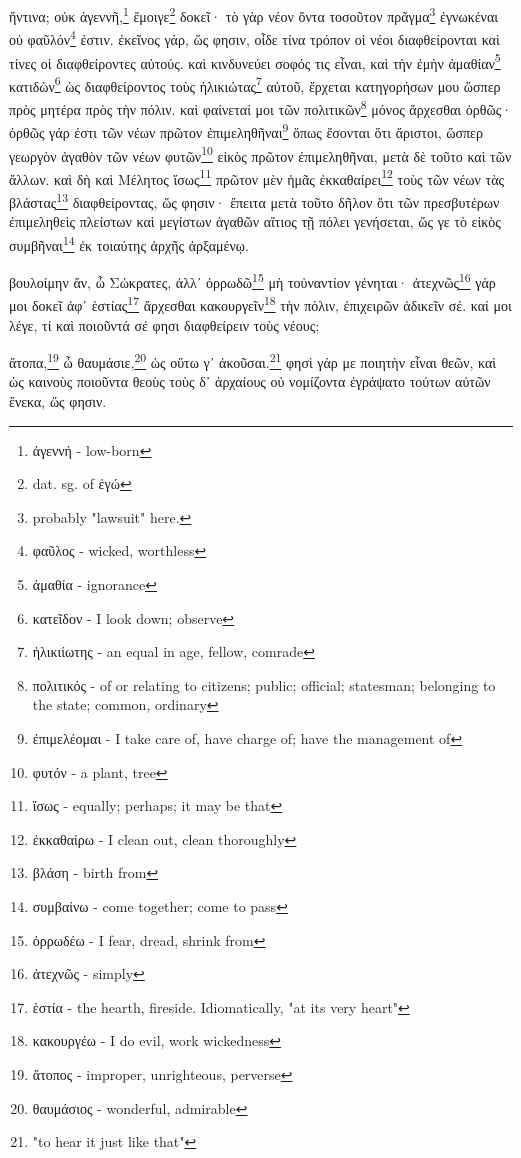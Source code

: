 ἥντινα;
οὐκ
ἀγεννῆ,\footnote{ἀγεννή - low-born}
ἔμοιγε\footnote{dat. sg. of ἐγώ}
δοκεῖ·
τὸ
γὰρ
νέον
ὄντα
τοσοῦτον
πρᾶγμα\footnote{probably "lawsuit" here.}
ἐγνωκέναι
οὐ
φαῦλόν\footnote{φαῦλος - wicked, worthless}
ἐστιν.
ἐκεῖνος
γάρ,
ὥς
φησιν,
οἶδε
τίνα
τρόπον
οἱ
νέοι
διαφθείρονται
καὶ
τίνες
οἱ
διαφθείροντες
αὐτούς.
καὶ
κινδυνεύει
σοφός
τις
εἶναι,
καὶ
τὴν
ἐμὴν
ἀμαθίαν\footnote{ἀμαθία - ignorance}
κατιδὼν\footnote{κατεῖδον - I look down; observe}
ὡς
διαφθείροντος
τοὺς
ἡλικιώτας\footnote{ἡλικιίωτης - an equal in age, fellow, comrade}
αὐτοῦ,
ἔρχεται
κατηγορήσων
μου
ὥσπερ
πρὸς
μητέρα
πρὸς
τὴν
πόλιν.
καὶ
φαίνεταί
μοι
τῶν
πολιτικῶν\footnote{πολιτικός - of or relating to citizens; public; official; statesman; belonging to the state; common, ordinary}
\versification{[2d]}
μόνος
ἄρχεσθαι
ὀρθῶς·
ὀρθῶς
γάρ
ἐστι
τῶν
νέων
πρῶτον
ἐπιμεληθῆναι\footnote{ἐπιμελέομαι - I take care of, have charge of; have the management of}
ὅπως
ἔσονται
ὅτι
ἄριστοι,
ὥσπερ
γεωργὸν
ἀγαθὸν
τῶν
νέων
φυτῶν\footnote{φυτόν - a plant, tree}
εἰκὸς
πρῶτον
ἐπιμεληθῆναι,
μετὰ
δὲ
τοῦτο
καὶ
τῶν
ἄλλων.
καὶ
δὴ
καὶ
Μέλητος
ἴσως\footnote{ἴσως - equally; perhaps; it may be that}
πρῶτον
\versification{[3a]}
μὲν
ἡμᾶς
ἐκκαθαίρει\footnote{ἐκκαθαίρω - I clean out, clean thoroughly}
τοὺς
τῶν
νέων
τὰς
βλάστας\footnote{βλάση - birth from}
διαφθείροντας,
ὥς
φησιν·
ἔπειτα
μετὰ
τοῦτο
δῆλον
ὅτι
τῶν
πρεσβυτέρων
ἐπιμεληθεὶς
πλείστων
καὶ
μεγίστων
ἀγαθῶν
αἴτιος
τῇ
πόλει
γενήσεται,
ὥς
γε
τὸ
εἰκὸς
συμβῆναι\footnote{συμβαίνω - come together; come to pass}
ἐκ
τοιαύτης
ἀρχῆς
ἀρξαμένῳ. 






βουλοίμην
ἄν,
ὦ
Σώκρατες,
ἀλλ᾽
ὀρρωδῶ\footnote{ὀρρωδέω - I fear, dread, shrink from}
μὴ
τοὐναντίον
γένηται·
ἀτεχνῶς\footnote{ἀτεχνῶς - simply}
γάρ
μοι
δοκεῖ
ἀφ᾽
ἑστίας\footnote{ἑστία - the hearth, fireside. Idiomatically, "at its very heart"}
ἄρχεσθαι
κακουργεῖν\footnote{κακουργέω - I do evil, work wickedness}
τὴν
πόλιν,
ἐπιχειρῶν
ἀδικεῖν
σέ.
καί
μοι
λέγε,
τί
καὶ
ποιοῦντά
σέ
φησι
διαφθείρειν
τοὺς
νέους; 

\versification{[3b]}
ἄτοπα,\footnote{ἄτοπος - improper, unrighteous, perverse}
ὦ
θαυμάσιε,\footnote{θαυμάσιος - wonderful, admirable}
ὡς
οὕτω
γ᾽
ἀκοῦσαι.\footnote{"to hear it just like that"}
φησὶ
γάρ
με
ποιητὴν
εἶναι
θεῶν,
καὶ
ὡς
καινοὺς
ποιοῦντα
θεοὺς
τοὺς
δ᾽
ἀρχαίους
οὐ
νομίζοντα
ἐγράψατο
τούτων
αὐτῶν
ἕνεκα,
ὥς
φησιν.

